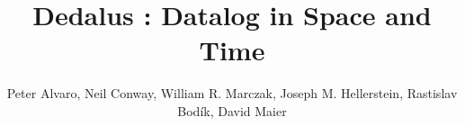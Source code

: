 \documentclass{acm_proc_article-sp-sigmod09}
\begin{document}
\title{Dedalus
: Datalog in Space and Time} 
%


\author{Peter Alvaro, Neil Conway, William R. Marczak, Joseph M. Hellerstein, Rastislav Bod\'{i}k, David Maier}

\maketitle
\end{document}
